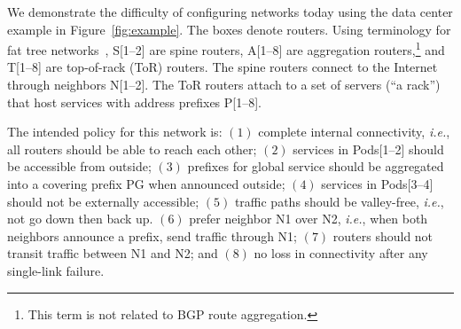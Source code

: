 \documentclass[numbers, 10pt, preprint]{sigplanconf}
\newcommand{\todo}[1]{\textcolor{red}{[TODO: #1]}}
\newcommand{\IE}{\emph{i.e.}}
\begin{document}
We demonstrate the difficulty of configuring networks today using the data center example in Figure~\ref{fig:example}. The boxes denote routers. Using terminology for fat tree networks~\cite{fattree}, S[1--2] are spine routers, A[1--8] are aggregation routers,\footnote{This term is not related to BGP route aggregation.} and T[1--8] are top-of-rack (ToR) routers. The spine routers connect to the Internet through neighbors N[1--2].
The ToR routers attach to a set of servers (``a rack'') that host services with address prefixes P[1--8].



The intended policy for this network is:
$(1)$ complete internal connectivity, \IE, all routers should be able to reach each other;
$(2)$ services in Pods[1--2] should be accessible from outside;
$(3)$ prefixes for global service should be aggregated into a covering prefix PG when announced outside;
$(4)$ services in Pods[3--4] should not be externally accessible;
$(5)$ traffic paths should be valley-free, \IE, not go down then back up.
$(6)$ prefer neighbor N1 over N2, \IE, when both neighbors announce a prefix, send traffic through N1;
$(7)$ routers should not transit traffic between N1 and N2; and
$(8)$ no loss in connectivity after any single-link failure.
\end{document}
